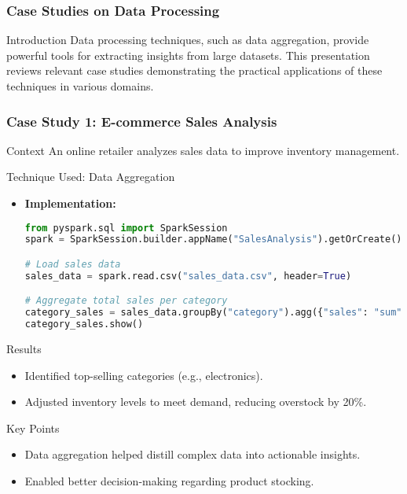 \documentclass[aspectratio=169]{beamer}
\begin{document}
\begin{frame}[fragile]
    \frametitle{Case Studies on Data Processing}
    \begin{block}{Introduction}
        Data processing techniques, such as data aggregation, provide powerful tools for extracting insights from large datasets. This presentation reviews relevant case studies demonstrating the practical applications of these techniques in various domains.
    \end{block}
\end{frame}

\begin{frame}[fragile]
    \frametitle{Case Study 1: E-commerce Sales Analysis}
    \begin{block}{Context}
        An online retailer analyzes sales data to improve inventory management.
    \end{block}
    
    \begin{block}{Technique Used: Data Aggregation}
        \begin{itemize}
            \item \textbf{Implementation:}
            \begin{lstlisting}[language=Python, caption=Data Aggregation Code Example]
from pyspark.sql import SparkSession
spark = SparkSession.builder.appName("SalesAnalysis").getOrCreate()

# Load sales data
sales_data = spark.read.csv("sales_data.csv", header=True)

# Aggregate total sales per category
category_sales = sales_data.groupBy("category").agg({"sales": "sum"})
category_sales.show()
            \end{lstlisting}
        \end{itemize}
    \end{block}
    
    \begin{block}{Results}
        \begin{itemize}
            \item Identified top-selling categories (e.g., electronics).
            \item Adjusted inventory levels to meet demand, reducing overstock by 20\%.
        \end{itemize}
    \end{block}
    
    \begin{block}{Key Points}
        \begin{itemize}
            \item Data aggregation helped distill complex data into actionable insights.
            \item Enabled better decision-making regarding product stocking.
        \end{itemize}
    \end{block}
\end{frame}
\end{document}

